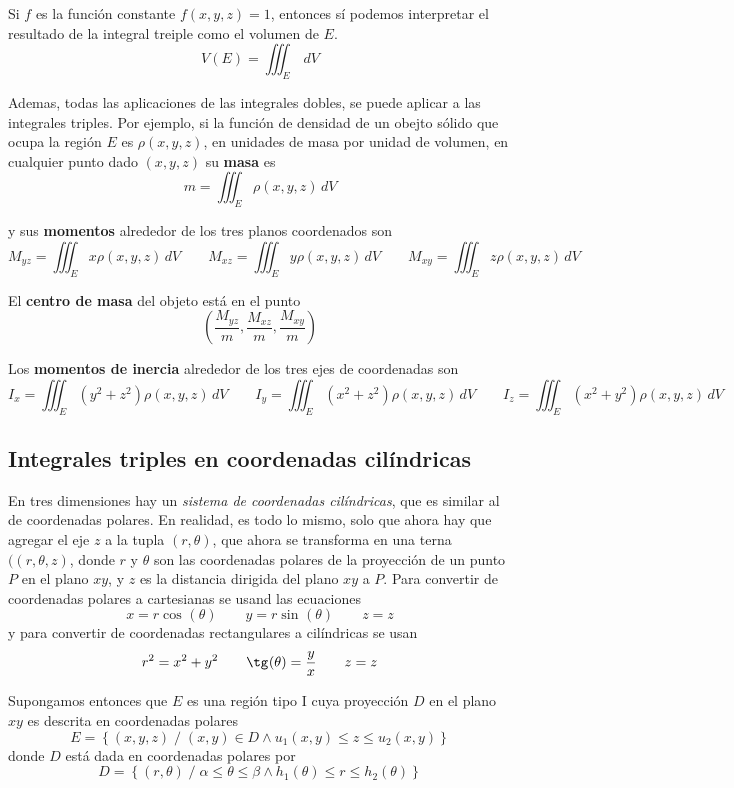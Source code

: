 \documentclass[12pt]{article}
\begin{document}
Si $ f $ es la función constante $ f(x,y,z)=1 $, entonces sí podemos interpretar el resultado de la integral treiple como el volumen de $ E $.
\[
  V(E)=\iiint_{E}  \,dV
\]

Ademas, todas las aplicaciones de las integrales dobles, se puede aplicar a las integrales triples. Por ejemplo, si la función de densidad de un obejto sólido que ocupa la región $ E $ es $ \rho(x,y,z) $, en unidades de masa por unidad de volumen, en cualquier punto dado $ (x,y,z) $ su \textbf{masa} es
\[
  m=\iiint_{E} \rho(x,y,z) \,dV
\]

y sus \textbf{momentos} alrededor de los tres planos coordenados son
\[
  M_{yz}=\iiint_{E} x\rho(x,y,z) \,dV \qquad M_{xz}=\iiint_{E} y\rho(x,y,z) \,dV \qquad M_{xy}=\iiint_{E} z\rho(x,y,z) \,dV
\]

El \textbf{centro de masa} del objeto está en el punto 
\[
  \left(\frac{M_{yz}}{m},\frac{M_{xz}}{m},\frac{M_{xy}}{m}\right)
\]

Los \textbf{momentos de inercia} alrededor de los tres ejes de coordenadas son
\[
  I_{x}=\iiint_{E} (y^2+z^2)\rho(x,y,z) \,dV \qquad I_{y}=\iiint_{E} (x^2+z^2)\rho(x,y,z) \,dV \qquad I_{z}=\iiint_{E} (x^2+y^2)\rho(x,y,z) \,dV
\]

\subsection{Integrales triples en coordenadas cilíndricas}
En tres dimensiones hay un \textit{sistema de coordenadas cilíndricas}, que es similar al de coordenadas polares. En realidad, es todo lo mismo, solo que ahora hay que agregar el eje $ z $ a la tupla $ (r,\theta) $, que ahora se transforma en una terna $ ((r,\theta,z) $, donde $ r $ y $ \theta $ son las coordenadas polares de la proyección de un punto $ P $ en el plano $ xy $, y $ z $ es la distancia dirigida del plano $ xy $ a $ P $. Para convertir de coordenadas polares a cartesianas se usand las ecuaciones
\[
  x=r\cos^{}(\theta)\qquad y=r\sin^{}(\theta) \qquad z=z
\]
y para convertir de coordenadas rectangulares a cilíndricas se usan
\[
  r^2=x^2+y^2 \qquad \tg^{}(\theta)=\frac{y}{x}\qquad z=z
\]

Supongamos entonces que $ E $ es una región tipo I cuya proyección $ D $ en el plano $ xy $ es descrita en coordenadas polares
\[
  E=\left\{(x,y,z) \;/\; (x,y) \in D \land u_{1}(x,y)\leq z\leq u_{2}(x,y)\right\}
\]
donde $ D $ está dada en coordenadas polares por 
\[
  D=\left\{(r,\theta) \;/\; \alpha\leq \theta\leq \beta \land h_{1}(\theta)\leq r\leq h_{2}(\theta)\right\}
\]
\end{document}
